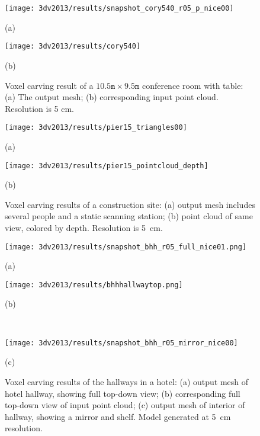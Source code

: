 \documentclass[12pt,onecolumn,oneside]{book}
\begin{document}
\begin{figure}
	\begin{minipage}[b]{0.48\linewidth}
	\centerline{\texttt{[image: 3dv2013/results/snapshot\_cory540\_r05\_p\_nice00]}}
	\centerline{(a)}\medskip
	\end{minipage}
	\hfill
	\begin{minipage}[b]{0.48\linewidth}
	\centerline{\texttt{[image: 3dv2013/results/cory540]}}
	\centerline{(b)}\medskip
	\end{minipage}
	\caption[Voxel carving result of conference room.]{Voxel carving result of a $10.5 \texttt{m} \times 9.5 \texttt{m}$ conference room with table: (a) The output mesh; (b) corresponding input point cloud.  Resolution is 5 cm.}
	\label{fig:3dv2013_cory540}
\end{figure}

\begin{figure}

	\centering
	\begin{minipage}[b]{0.98\linewidth}
	\centerline{\texttt{[image: 3dv2013/results/pier15\_triangles00]}}
	\centerline{(a)}
	\end{minipage}
	\begin{minipage}[b]{0.98\linewidth}
	\centerline{\texttt{[image: 3dv2013/results/pier15\_pointcloud\_depth]}}
	\centerline{(b)}\medskip
	\end{minipage}

	\caption[Voxel carving results of a construction area.]{Voxel carving results of a construction site:  (a) output mesh includes several people and a static scanning station; (b) point cloud of same view, colored by depth.  Resolution is 5~cm.}
	\label{fig:3dv2013_pier15}
\end{figure}

\begin{figure}[t]

	\centering
	\begin{minipage}[b]{0.45\linewidth}
	\centerline{\texttt{[image: 3dv2013/results/snapshot\_bhh\_r05\_full\_nice01.png]}}
	\centerline{(a)}
	\end{minipage}
	\hfill
	\begin{minipage}[b]{0.45\linewidth}
	\centerline{\texttt{[image: 3dv2013/results/bhhhallwaytop.png]}}
	\centerline{(b)}
	\end{minipage}
	\\
	\begin{minipage}[b]{0.9\linewidth}
	\centerline{\texttt{[image: 3dv2013/results/snapshot\_bhh\_r05\_mirror\_nice00]}}
	\centerline{(c)}
	\end{minipage}

	\caption[Voxel carving results of hotel hallways.]{Voxel carving results of the hallways in a hotel: (a) output mesh of hotel hallway, showing full top-down view; (b) corresponding full top-down view of input point cloud; (c) output mesh of interior of hallway, showing a mirror and shelf.  Model generated at 5~cm resolution.}
	\label{fig:3dv2013_bhh_hallway}
\end{figure}
\end{document}
